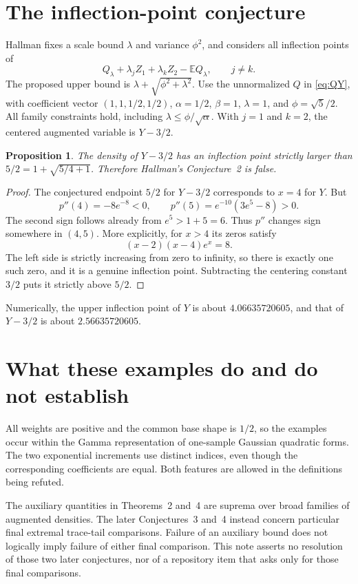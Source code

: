 \documentclass[11pt]{article}
\newtheorem{proposition}[theorem]{Proposition}
\theoremstyle{definition}
\newcommand{\E}{\mathbb E}
\begin{document}
\section{The inflection-point conjecture}
Hallman \cite[Theorem~4 and Conjecture~2]{Hallman2024} fixes a scale bound $\lambda$ and variance $\phi^2$, and considers all inflection points of
\[
 Q_\lambda+\lambda_jZ_1+\lambda_kZ_2-\E Q_\lambda,
 \qquad j\ne k.
\]
The proposed upper bound is $\lambda+\sqrt{\phi^2+\lambda^2}$. Use the unnormalized $Q$ in \eqref{eq:QY}, with coefficient vector $(1,1,1/2,1/2)$, $\alpha=1/2$, $\beta=1$, $\lambda=1$, and $\phi=\sqrt5/2$. All family constraints hold, including $\lambda\le\phi/\sqrt\alpha$. With $j=1$ and $k=2$, the centered augmented variable is $Y-3/2$.

\begin{proposition}
The density of $Y-3/2$ has an inflection point strictly larger than $5/2=1+\sqrt{5/4+1}$. Therefore Hallman's Conjecture~2 is false.
\end{proposition}
\begin{proof}
The conjectured endpoint $5/2$ for $Y-3/2$ corresponds to $x=4$ for $Y$. But
\[
 p''(4)=-8e^{-8}<0,
 \qquad p''(5)=e^{-10}(3e^5-8)>0.
\]
The second sign follows already from $e^5>1+5=6$. Thus $p''$ changes sign somewhere in $(4,5)$. More explicitly, for $x>4$ its zeros satisfy
\[
 (x-2)(x-4)e^x=8.
\]
The left side is strictly increasing from zero to infinity, so there is exactly one such zero, and it is a genuine inflection point. Subtracting the centering constant $3/2$ puts it strictly above $5/2$.
\end{proof}
Numerically, the upper inflection point of $Y$ is about $4.06635720605$, and that of $Y-3/2$ is about $2.56635720605$.

\section{What these examples do and do not establish}
All weights are positive and the common base shape is $1/2$, so the examples occur within the Gamma representation of one-sample Gaussian quadratic forms. The two exponential increments use distinct indices, even though the corresponding coefficients are equal. Both features are allowed in the definitions being refuted.

The auxiliary quantities in Theorems~2 and~4 are suprema over broad families of augmented densities. The later Conjectures~3 and~4 instead concern particular final extremal trace-tail comparisons. Failure of an auxiliary bound does not logically imply failure of either final comparison. This note asserts no resolution of those two later conjectures, nor of a repository item that asks only for those final comparisons.
\end{document}
